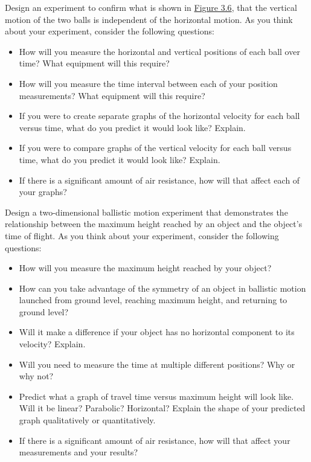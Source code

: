 \documentclass[
]{book}
\providecommand{\tightlist}{%
  \setlength{\itemsep}{0pt}\setlength{\parskip}{0pt}}
\begin{document}
Design an experiment to confirm what is shown in \protect\hyperlink{import-auto-id1165296248287}{Figure
3.6}, that the vertical motion of the two
balls is independent of the horizontal motion. As you think about your
experiment, consider the following questions:

\begin{itemize}
\tightlist
\item
  How will you measure the horizontal and vertical positions of each
  ball over time? What equipment will this require?
\item
  How will you measure the time interval between each of your position
  measurements? What equipment will this require?
\item
  If you were to create separate graphs of the horizontal velocity for
  each ball versus time, what do you predict it would look like?
  Explain.
\item
  If you were to compare graphs of the vertical velocity for each ball
  versus time, what do you predict it would look like? Explain.
\item
  If there is a significant amount of air resistance, how will that
  affect each of your graphs?
\end{itemize}

Design a two-dimensional ballistic motion experiment that demonstrates
the relationship between the maximum height reached by an object and the
object's time of flight. As you think about your experiment, consider
the following questions:

\begin{itemize}
\tightlist
\item
  How will you measure the maximum height reached by your object?
\item
  How can you take advantage of the symmetry of an object in ballistic
  motion launched from ground level, reaching maximum height, and
  returning to ground level?
\item
  Will it make a difference if your object has no horizontal component
  to its velocity? Explain.
\item
  Will you need to measure the time at multiple different positions?
  Why or why not?
\item
  Predict what a graph of travel time versus maximum height will look
  like. Will it be linear? Parabolic? Horizontal? Explain the shape of
  your predicted graph qualitatively or quantitatively.
\item
  If there is a significant amount of air resistance, how will that
  affect your measurements and your results?
\end{itemize}
\end{document}
